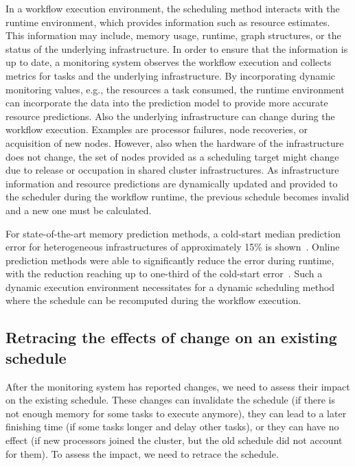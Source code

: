\documentclass[conference]{IEEEtran}
\begin{document}
    In a workflow execution environment, the scheduling method interacts with the runtime environment, which provides information such as resource estimates.
    This information may include, memory usage, runtime, graph structures, or the status of the underlying infrastructure.
    In order to ensure that the information is up to date, a monitoring system observes the workflow execution and collects metrics for tasks and the underlying infrastructure.
    By incorporating dynamic monitoring values, e.g., the resources a task consumed, the runtime environment can incorporate the data into the prediction model to provide more accurate resource predictions.
    Also the underlying infrastructure can change during the workflow execution.
    Examples are processor failures, node recoveries, or acquisition of new nodes.
    However, also when the hardware of the infrastructure does not change, the set of nodes provided as a scheduling target might change due to release or occupation in shared cluster infrastructures.
    As infrastructure information and resource predictions are dynamically updated and provided to the scheduler during the workflow runtime, the previous schedule becomes invalid and a new one must be calculated.

    For state-of-the-art memory prediction methods, a cold-start median prediction error for heterogeneous infrastructures of approximately 15\% is shown~\cite{}.
    Online prediction methods were able to significantly reduce the error during runtime, with the reduction reaching up to one-third of the cold-start error~\cite{baderDiedrichDynamic2023,witt2019learning}.
    Such a dynamic execution environment necessitates for a dynamic scheduling method where the schedule can be recomputed during the workflow execution.

    \subsection{Retracing the effects of change on an existing schedule}
    After the monitoring system has reported changes, we need to assess their impact on the existing schedule.
    These changes can invalidate the schedule (\eg if there is not enough memory for some tasks to execute anymore),
    they can lead to a later finishing time (\eg if some tasks longer and delay other tasks), or they can have no effect (\eg if new processors
    joined the cluster, but the old schedule did not account for them).
    To assess the impact, we need to retrace the schedule.
\end{document}
